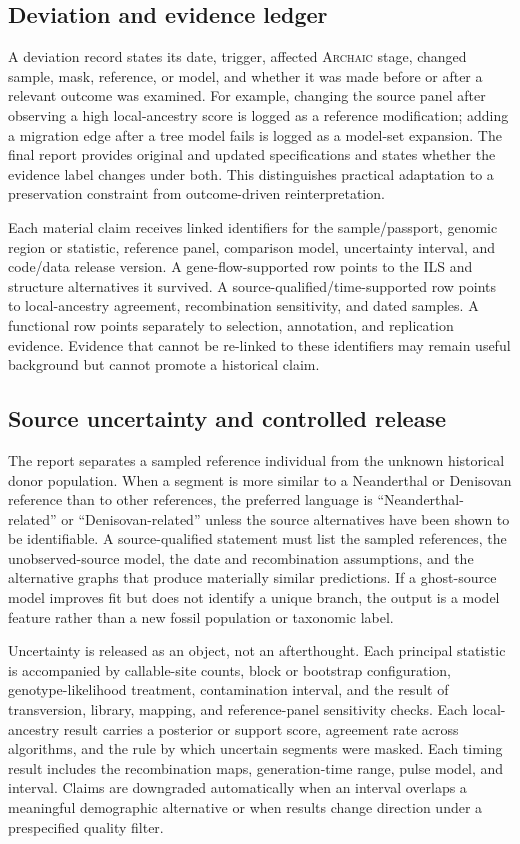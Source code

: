 \documentclass[conference]{IEEEtran}
\newcommand{\archaic}{\textsc{Archaic}}
\begin{document}
\subsection{Deviation and evidence ledger}

A deviation record states its date, trigger, affected \archaic{} stage, changed sample, mask, reference, or model, and whether it was made before or after a relevant outcome was examined. For example, changing the source panel after observing a high local-ancestry score is logged as a reference modification; adding a migration edge after a tree model fails is logged as a model-set expansion. The final report provides original and updated specifications and states whether the evidence label changes under both. This distinguishes practical adaptation to a preservation constraint from outcome-driven reinterpretation.

Each material claim receives linked identifiers for the sample/passport, genomic region or statistic, reference panel, comparison model, uncertainty interval, and code/data release version. A gene-flow-supported row points to the ILS and structure alternatives it survived. A source-qualified/time-supported row points to local-ancestry agreement, recombination sensitivity, and dated samples. A functional row points separately to selection, annotation, and replication evidence. Evidence that cannot be re-linked to these identifiers may remain useful background but cannot promote a historical claim.

\subsection{Source uncertainty and controlled release}

The report separates a sampled reference individual from the unknown historical donor population. When a segment is more similar to a Neanderthal or Denisovan reference than to other references, the preferred language is ``Neanderthal-related'' or ``Denisovan-related'' unless the source alternatives have been shown to be identifiable. A source-qualified statement must list the sampled references, the unobserved-source model, the date and recombination assumptions, and the alternative graphs that produce materially similar predictions. If a ghost-source model improves fit but does not identify a unique branch, the output is a model feature rather than a new fossil population or taxonomic label.

Uncertainty is released as an object, not an afterthought. Each principal statistic is accompanied by callable-site counts, block or bootstrap configuration, genotype-likelihood treatment, contamination interval, and the result of transversion, library, mapping, and reference-panel sensitivity checks. Each local-ancestry result carries a posterior or support score, agreement rate across algorithms, and the rule by which uncertain segments were masked. Each timing result includes the recombination maps, generation-time range, pulse model, and interval. Claims are downgraded automatically when an interval overlaps a meaningful demographic alternative or when results change direction under a prespecified quality filter.
\end{document}
